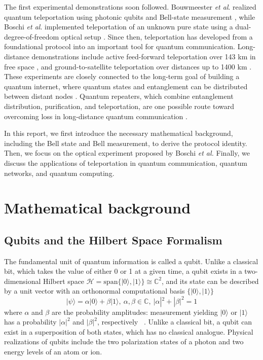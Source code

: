 \documentclass[aps,prd,preprint,floats,epsf,superscriptaddress,nofootinbib]{revtex4}
\begin{document}
The first experimental demonstrations soon followed. Bouwmeester \textit{et al}. realized quantum teleportation using photonic qubits and Bell-state measurement \cite{Bouwmeester}, while Boschi \textit{et al}. implemented teleportation of an unknown pure state using a dual-degree-of-freedom optical setup \cite{Boschi1998}. Since then, teleportation has developed from a foundational protocol into an important tool for quantum communication. Long-distance demonstrations include active feed-forward teleportation over 143 km in free space \cite{Ma2012}, and ground-to-satellite teleportation over distances up to 1400 km \cite{Ren2017}. These experiments are closely connected to the long-term goal of building a quantum internet, where quantum states and entanglement can be distributed between distant nodes \cite{Kimble2008}. Quantum repeaters, which combine entanglement distribution, purification, and teleportation, are one possible route toward overcoming loss in long-distance quantum communication \cite{Briegel1998}.

In this report, we first introduce the necessary mathematical background, including the Bell state and Bell measurement, to derive the protocol identity. Then, we focus on the optical experiment proposed by Boschi \textit{et al.} Finally, we discuss the applications of teleportation in quantum communication, quantum networks, and quantum computing.

\newpage
\section{Mathematical background}
\label{sec:math background}
\subsection{Qubits and the Hilbert Space Formalism}
The fundamental unit of quantum information is called a qubit. Unlike a classical bit, which takes the value of either 0 or 1 at a given time, a qubit exists in a two-dimensional Hilbert space $\mathcal{H}=\mathrm{span}\{|0\rangle, |1\rangle\} \cong \mathbb{C}^2$, and its state can be described by a unit vector with an orthonormal computational basis $\{|0\rangle, |1\rangle\}$ \begin{equation}
  |\psi\rangle = \alpha|0\rangle+\beta|1\rangle, \ \alpha, \beta \in \mathbb{C}, \  |\alpha|^2+|\beta|^2=1
  \label{Eq: qubit}
\end{equation}
where $\alpha$ and $\beta$ are the probability amplitudes: measurement yielding $|0\rangle$ or $|1\rangle$ has a probability $|\alpha|^2$ and $|\beta|^2$, respectively  ~\cite{NielsenChuang2000}. Unlike a classical bit, a qubit can exist in a superposition of both states, which has no classical analogue. Physical realizations of qubits include the two polarization states of a photon and two energy levels of an atom or ion. 
\end{document}
